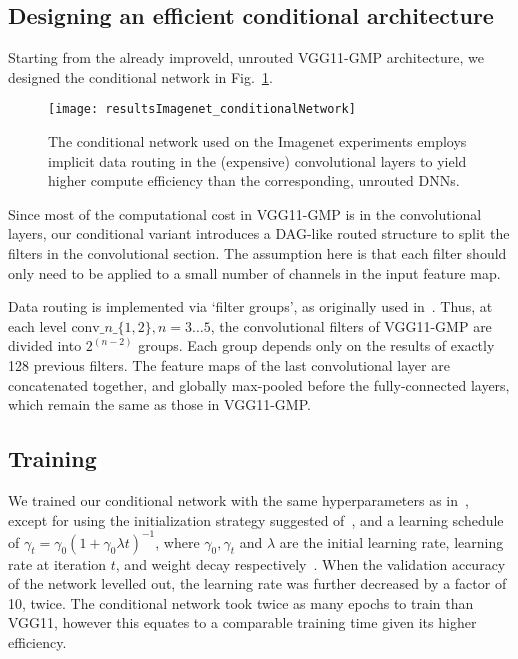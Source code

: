 \documentclass[thesis]{subfiles}
\begin{document}
\subsection{Designing an efficient conditional architecture}
Starting from the already improveld, unrouted VGG11-GMP architecture, we designed the conditional network in Fig.~\ref{fig:Imagenet_CondNet}.
\begin{figure}[t]
\centering
\texttt{[image: resultsImagenet\_conditionalNetwork]}
\caption[Conditional network used with Imagenet ILSVRC experiments]{The conditional network used on the Imagenet experiments employs implicit data routing in the (expensive) convolutional layers to yield higher compute efficiency than the corresponding, unrouted DNNs.}
\label{fig:Imagenet_CondNet}
\end{figure}
%
Since most of the computational cost in VGG11-GMP is in the convolutional layers, our conditional variant 
introduces a DAG-like routed structure to split the filters in the convolutional section.
The assumption here is that each filter should only need to be applied to a small number of channels in the input feature map.

Data routing is implemented via `filter groups', as originally used in~\cite{Krizhevsky2012imanet}. 
Thus, at each level $\textrm{conv}\_n\_\{1,2\}, n=3\ldots 5$, the convolutional filters of VGG11-GMP are 
divided into $2^{(n-2)}$ groups. Each group depends only on the results of exactly 128 previous filters. 
The feature maps of the last convolutional layer are concatenated together, and globally max-pooled
 before the fully-connected layers, which remain the same as those in VGG11-GMP.

\subsection{Training}
We trained our conditional network with the same hyperparameters as in~\cite{Simonyan2014verydeep}, 
except for using the initialization strategy suggested of~\cite{He2015delving}, and a learning schedule of 
$\gamma_t = \gamma_0(1+\gamma_0\lambda t)^{-1}$, where $\gamma_0,\gamma_t$ and $\lambda$ 
are the initial learning rate, learning rate at iteration $t$, and weight decay respectively~\cite{Bottou2012sgdtricks}. 
When the validation accuracy of the network levelled out, the learning rate was further decreased by a factor of 10, twice. 
The conditional network took twice as many epochs to train than VGG11, however this equates to a comparable
 training time given its higher efficiency.
\end{document}
